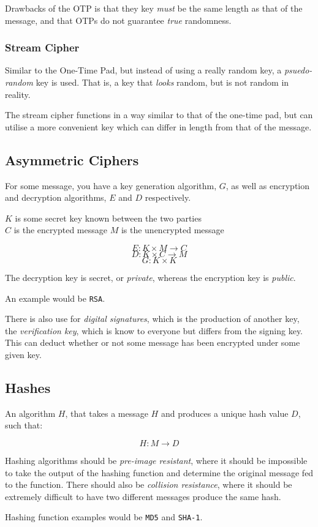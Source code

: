\documentclass{article}
\begin{document}
Drawbacks of the OTP is that they key \textit{must} be the same length as that of the message, and that OTPs do not guarantee \textit{true} randomness.

\subsubsection{Stream Cipher}

Similar to the One-Time Pad, but instead of using a really random key, a \textit{psuedo-random} key is used. That is, a key that \textit{looks} random, but is not random in reality.

The stream cipher functions in a way similar to that of the one-time pad, but can utilise a more convenient key which can differ in length from that of the message.

\subsection{Asymmetric Ciphers}

For some message, you have a key generation algorithm, $G$, as well as encryption and decryption algorithms, $E$ and $D$ respectively.

\vspace{.5cm}
\begin{center}
  $K$ is some secret key known between the two parties\\
  $C$ is the encrypted message
  $M$ is the unencrypted message
\end{center}

\[ E : K \times M \rightarrow C\]
\[ D : K \times C \rightarrow M\]
\[ G : K \times K \]

The decryption key is secret, or \textit{private}, whereas the encryption key is \textit{public}.

An example would be \texttt{RSA}.
 
There is also use for \textit{digital signatures}, which is the production of another key, the \textit{verification key}, which is know to everyone but differs from the signing key. This can deduct whether or not some message has been encrypted under some given key.

\subsection{Hashes}

An algorithm $H$, that takes a message $H$ and produces a unique hash value $D$, such that:

\[ H : M \rightarrow D\]

Hashing algorithms should be \textit{pre-image resistant}, where it should be impossible to take the output of the hashing function and determine the original message fed to the function. There should also be \textit{collision resistance}, where it should be extremely difficult to have two different messages produce the same hash.

Hashing function examples would be \texttt{MD5} and \texttt{SHA-1}.
\end{document}
